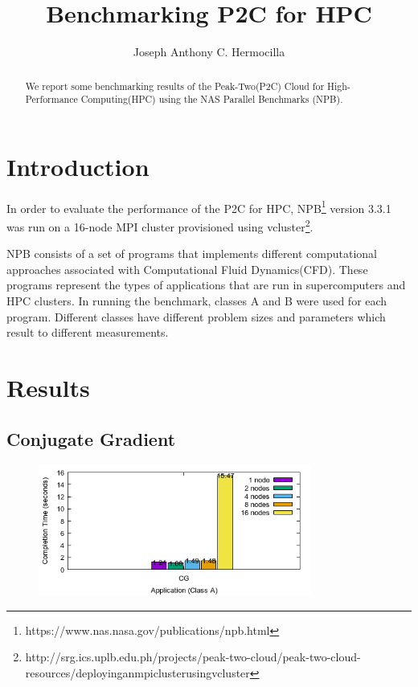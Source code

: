 \documentclass[a4paper]{article}
\title{Benchmarking P2C for HPC}
\author{Joseph Anthony C. Hermocilla}
\begin{document}
\maketitle

\begin{abstract}
We report some benchmarking results of the Peak-Two(P2C) Cloud for High-Performance Computing(HPC) using the NAS Parallel Benchmarks (NPB).
\end{abstract}

\section{Introduction}

In order to evaluate the performance of the P2C\cite{hermocilla-p2c-ncite2014} for HPC, NPB\footnote{https://www.nas.nasa.gov/publications/npb.html} version 3.3.1 was run on a 16-node MPI cluster provisioned using vcluster\footnote{http://srg.ics.uplb.edu.ph/projects/peak-two-cloud/peak-two-cloud-resources/deployinganmpiclusterusingvcluster}.

NPB consists of a set of programs that implements different computational approaches associated with Computational Fluid Dynamics(CFD). These programs represent the types of applications that are run in supercomputers and HPC clusters. In running the benchmark, classes A and B were used for each program. Different classes have different problem sizes and parameters which result to different measurements.

\section{Results}

\subsection{Conjugate Gradient}

\begin{figure}[H]
\centering
\includegraphics[width=0.8\textwidth]{figures/CGvA.png}
\caption{\label{fig:CGvA}}
\end{figure}
\end{document}
